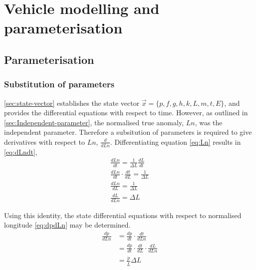\chapter{Vehicle modelling and parameterisation}\label{cha:Vehicle}

\section{Parameterisation} \label{sec:Parameterisation}

\subsection{Substitution of parameters}\label{sub:subst-param}
\autoref{sec:state-vector} establishes the state vector $\vec{x}=\{p,f,g,h,k,L,m,t,E\}$, and provides the differential equations with respect to time. However, as outlined in \autoref{sec:Independent-parameter}, the normalised true anomaly, $Ln$, was the independent parameter. Therefore a subsitution of parameters is required to give derivatives with respect to $Ln$, $\frac{d}{dLn}$. Differentiating equation \eqref{eq:Ln} results in \eqref{eq:dLndt},
\begin{subequations} \label{eq:dLndt}
\begin{gather}
\frac{dLn}{dt}=\frac{1}{\Delta L}\frac{dL}{dt} \\
\frac{dLn}{dt}\cdot\frac{dt}{dL}=\frac{1}{\Delta L} \\
\frac{dLn}{dL}=\frac{1}{\Delta L} \\
\frac{dL}{dLn}=\Delta L
\end{gather}
\end{subequations}

Using this identity, the state differential equations with respect to normalised longitude \eqref{eq:dpdLn} may be determined.
\begin{subequations}\label{eq:dpdLn}
\begin{align}
\frac{dp}{dLn}&=\frac{dp}{dt}\cdot\frac{dt}{dLn}\\
&=\frac{dp}{dt}\cdot\frac{dt}{dL}\cdot\frac{dL}{dLn}\\
&=\frac{\dot{p}}{\dot{L}}\Delta L
\end{align}
\end{subequations}

